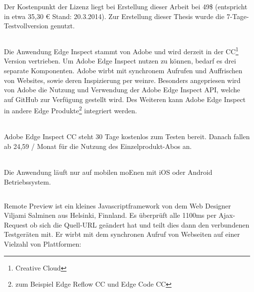 	Der Kostenpunkt der Lizenz liegt bei Erstellung dieser Arbeit bei 49\$ (entspricht in etwa 35,30 € Stand: 20.3.2014). Zur Erstellung dieser Thesis wurde die 7-Tage-Testvollversion genutzt.
	
	\subsection{}
	Die Anwendung Edge Inspect stammt von Adobe und wird derzeit in der CC\footnote{Creative \Gls{Cloud}} Version vertrieben. Um Adobe Edge Inspect nutzen zu können, bedarf es drei separate Komponenten. Adobe wirbt mit synchronem Aufrufen und Auffrischen von Websites, sowie deren Inspizierung per weinre. Besonders angepriesen wird von Adobe die Nutzung und Verwendung der Adobe Edge Inspect API, welche auf GitHub zur Verfügung gestellt wird. Des Weiteren kann Adobe Edge Inspect in andere Edge Produkte\footnote{zum Beispiel Edge Reflow CC und Edge Code CC} integriert werden. 
	
	\\Adobe Edge Inspect CC steht 30 Tage kostenlos zum Testen bereit. Danach fallen ab 24,59 / Monat für die Nutzung des Einzelprodukt-Abos an.
	
	\\Die Anwendung läuft nur auf mobilen \Gls{moEn}en mit iOS oder Android Betriebssystem.
	
	\subsection{}
	Remote Preview ist ein kleines \Gls{Javascript}framework von dem Web Designer Viljami Salminen aus Helsinki, Finnland. Es überprüft alle 1100ms per \Gls{Ajax}-Request ob sich die Quell-URL geändert hat und teilt dies dann den verbundenen Testgeräten mit. Er wirbt mit dem synchronen Aufruf von Webseiten auf einer Vielzahl von Plattformen: 
	
